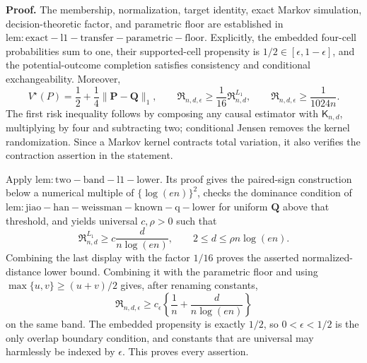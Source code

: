 \textbf{Proof.}
The membership, normalization, target identity, exact Markov simulation, decision-theoretic factor, and parametric floor are established in \(\mathrm{lem:exact-l1-transfer-parametric-floor}\).  Explicitly, the embedded four-cell probabilities sum to one, their supported-cell propensity is \(1/2\in[\epsilon,1-\epsilon]\), and the potential-outcome completion satisfies consistency and conditional exchangeability.  Moreover,
\[
 V^\star(P)=\frac12+\frac14\lVert\mathbf P-\mathbf Q\rVert_1,
 \qquad
 \mathfrak R_{n,d,\epsilon}
 \geq\frac1{16}\mathfrak R^{L_1}_{n,d},
 \qquad
 \mathfrak R_{n,d,\epsilon}\geq\frac1{1024n}.
\]
The first risk inequality follows by composing any causal estimator with \(\mathsf K_{n,d}\), multiplying by four and subtracting two; conditional Jensen removes the kernel randomization.  Since a Markov kernel contracts total variation, it also verifies the contraction assertion in the statement.

Apply \(\mathrm{lem:two-band-l1-lower}\).  Its proof gives the paired-sign construction below a numerical multiple of \(\{\log(en)\}^2\), checks the dominance condition of \(\mathrm{lem:jiao-han-weissman-known-q-lower}\) for uniform \(\mathbf Q\) above that threshold, and yields universal \(c,\rho>0\) such that
\[
 \mathfrak R^{L_1}_{n,d}\geq c\frac{d}{n\log(en)},
 \qquad
 2\leq d\leq\rho n\log(en).
\]
Combining the last display with the factor \(1/16\) proves the asserted normalized-distance lower bound.  Combining it with the parametric floor and using \(\max\{u,v\}\geq(u+v)/2\) gives, after renaming constants,
\[
 \mathfrak R_{n,d,\epsilon}
 \geq c_\epsilon\left\{\frac1n+\frac{d}{n\log(en)}\right\}
\]
on the same band.  The embedded propensity is exactly \(1/2\), so \(0<\epsilon<1/2\) is the only overlap boundary condition, and constants that are universal may harmlessly be indexed by \(\epsilon\).  This proves every assertion.